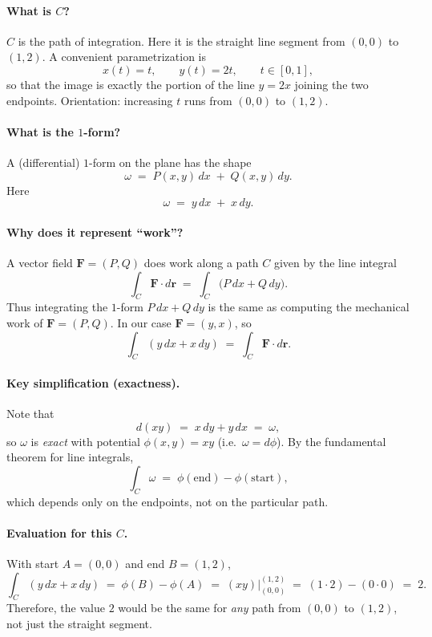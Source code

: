 \documentclass[11pt]{article}
\begin{document}
\paragraph{What is $C$?}
$C$ is the path of integration. Here it is the straight line segment from $(0,0)$ to $(1,2)$.
A convenient parametrization is
\[
x(t)=t,\qquad y(t)=2t,\qquad t\in[0,1],
\]
so that the image is exactly the portion of the line $y=2x$ joining the two endpoints.
Orientation: increasing $t$ runs from $(0,0)$ to $(1,2)$.

\paragraph{What is the $1$-form?}
A (differential) $1$-form on the plane has the shape
\[
\omega \;=\; P(x,y)\,dx \;+\; Q(x,y)\,dy.
\]
Here
\[
\omega \;=\; y\,dx \;+\; x\,dy.
\]

\paragraph{Why does it represent ``work''?}
A vector field $\mathbf F=(P,Q)$ does work along a path $C$ given by the line integral
\[
\int_C \mathbf F\cdot d\mathbf r
\;=\;
\int_C \bigl(P\,dx + Q\,dy\bigr).
\]
Thus integrating the $1$-form $P\,dx+Q\,dy$ is the same as computing the mechanical work
of $\mathbf F=(P,Q)$. In our case $\mathbf F=(y,x)$, so
\[
\int_C (y\,dx+x\,dy) \;=\; \int_C \mathbf F\cdot d\mathbf r.
\]

\paragraph{Key simplification (exactness).}
Note that
\[
d(xy) \;=\; x\,dy + y\,dx \;=\; \omega,
\]
so $\omega$ is \emph{exact} with potential $\phi(x,y)=xy$ (i.e.\ $\omega=d\phi$).
By the fundamental theorem for line integrals,
\[
\int_C \omega \;=\; \phi(\text{end}) - \phi(\text{start}),
\]
which depends only on the endpoints, not on the particular path.

\paragraph{Evaluation for this $C$.}
With start $A=(0,0)$ and end $B=(1,2)$,
\[
\int_C (y\,dx+x\,dy)
\;=\;
\phi(B)-\phi(A)
\;=\;
(xy)\Big|_{(0,0)}^{(1,2)}
\;=\;
(1\cdot 2) - (0\cdot 0)
\;=\; 2.
\]
Therefore, the value $2$ would be the same for \emph{any} path from $(0,0)$ to $(1,2)$,
not just the straight segment.
\end{document}
